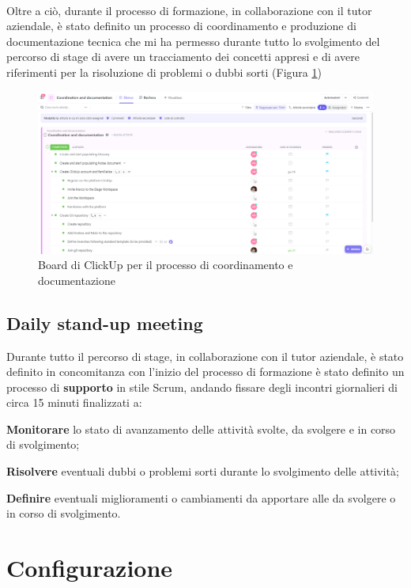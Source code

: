 \\
Oltre a ciò, durante il processo di formazione, in collaborazione con il tutor aziendale, è stato definito un processo di coordinamento e produzione di 
documentazione tecnica che mi ha permesso durante tutto lo svolgimento del percorso di stage di avere un tracciamento dei concetti appresi 
e di avere riferimenti per la risoluzione di problemi o dubbi sorti (Figura \ref{cap:Documentazione})
\begin{figure}[h]
    \centering
    \includegraphics[width=1\textwidth]{images/percorso/coordinamento.png}
    \caption{Board di ClickUp per il processo di coordinamento e documentazione}
    \label{cap:Documentazione}
\end{figure}
\subsection{Daily stand-up meeting}
Durante tutto il percorso di stage, in collaborazione con il tutor aziendale, è stato definito in concomitanza con l'inizio del processo di formazione
è stato definito un processo di \textbf{supporto} in stile \gls{Scrum}{}, andando fissare degli incontri giornalieri di circa 15 minuti finalizzati a:
\begin{list}{*}
    \item \textbf{Monitorare} lo stato di avanzamento delle attività svolte, da svolgere e in corso di svolgimento;
    \item \item \textbf{Risolvere} eventuali dubbi o problemi sorti durante lo svolgimento delle attività;
    \item \textbf{Definire} eventuali miglioramenti o cambiamenti da apportare alle da svolgere o in corso di svolgimento.
\end{list}
\section{Configurazione}
